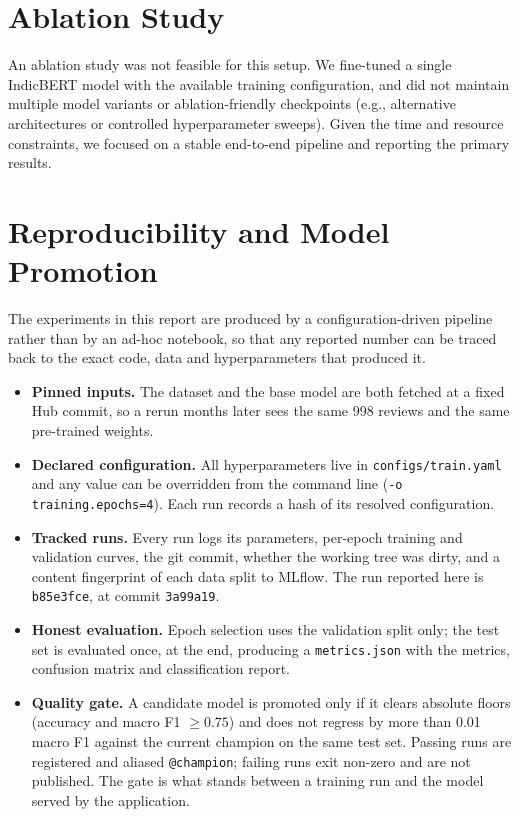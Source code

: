 \documentclass[11pt,a4paper]{article}
\begin{document}
\section{Ablation Study}

An ablation study was not feasible for this setup. We fine-tuned a single IndicBERT model with the available training configuration, and did not maintain multiple model variants or ablation-friendly checkpoints (e.g., alternative architectures or controlled hyperparameter sweeps). Given the time and resource constraints, we focused on a stable end-to-end pipeline and reporting the primary results.

\section{Reproducibility and Model Promotion}

The experiments in this report are produced by a configuration-driven pipeline rather than by an ad-hoc notebook, so that any reported number can be traced back to the exact code, data and hyperparameters that produced it.

\begin{itemize}[noitemsep]
    \item \textbf{Pinned inputs.} The dataset and the base model are both fetched at a fixed Hub commit, so a rerun months later sees the same 998 reviews and the same pre-trained weights.
    \item \textbf{Declared configuration.} All hyperparameters live in \texttt{configs/train.yaml} and any value can be overridden from the command line (\texttt{-o training.epochs=4}). Each run records a hash of its resolved configuration.
    \item \textbf{Tracked runs.} Every run logs its parameters, per-epoch training and validation curves, the git commit, whether the working tree was dirty, and a content fingerprint of each data split to MLflow. The run reported here is \texttt{b85e3fce}, at commit \texttt{3a99a19}.
    \item \textbf{Honest evaluation.} Epoch selection uses the validation split only; the test set is evaluated once, at the end, producing a \texttt{metrics.json} with the metrics, confusion matrix and classification report.
    \item \textbf{Quality gate.} A candidate model is promoted only if it clears absolute floors (accuracy and macro F1 $\geq 0.75$) and does not regress by more than 0.01 macro F1 against the current champion on the same test set. Passing runs are registered and aliased \texttt{@champion}; failing runs exit non-zero and are not published. The gate is what stands between a training run and the model served by the application.
\end{itemize}
\end{document}
